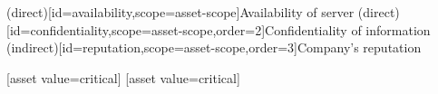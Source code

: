 \begin{center}
\begin{corasassetdiagram}[x=.95cm,y=.95cm,asset columns=3]
  \asset(direct)[id=availability,scope=asset-scope]{Availability of server}
  \asset(direct)[id=confidentiality,scope=asset-scope,order=2]{Confidentiality of information}
  \asset(indirect)[id=reputation,scope=asset-scope,order=3]{Company's reputation}

  \corasscope[
    name=asset-box,
    scope=asset-scope,
    kind=asset-scope,
    party=company,
    party corner=left
  ]

  [asset value=critical]
  [asset value=critical]
\end{corasassetdiagram}
\end{center}
